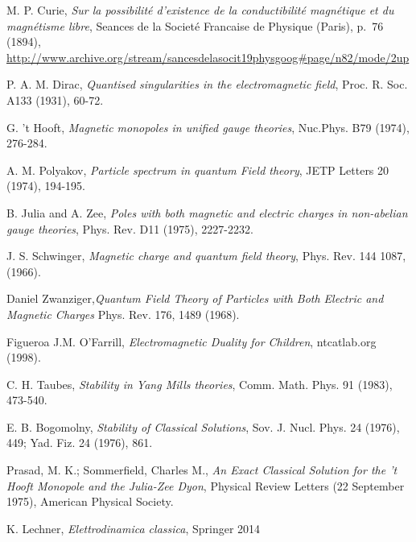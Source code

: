 \clearpage
{}
{}


\begin{thebibliography}{99}

M. P. Curie,
\emph{Sur la possibilité d'existence de la conductibilité magnétique et du magnétisme libre},
Seances de la Societé Francaise de Physique (Paris), p.\ 76 (1894), 
\url{http://www.archive.org/stream/sancesdelasocit19physgoog#page/n82/mode/2up}

P. A. M. Dirac,
\emph{Quantised singularities in the electromagnetic field}, Proc. R. Soc. A133 (1931), 60-72.

G. 't Hooft, \emph{Magnetic monopoles in unified gauge theories}, Nuc.Phys. B79 (1974), 276-284.

A. M. Polyakov, \emph{Particle spectrum in quantum Field theory}, JETP Letters 20 (1974), 194-195.

B. Julia and A. Zee, \emph{Poles with both magnetic and electric charges
in non-abelian gauge theories}, Phys. Rev. D11 (1975), 2227-2232.

J. S. Schwinger, \emph{Magnetic charge and quantum field theory}, Phys. Rev. 144 1087, (1966).

Daniel Zwanziger,\emph{Quantum Field Theory of Particles with Both Electric and Magnetic Charges} Phys. Rev. 176, 1489 (1968).

Figueroa J.M. O'Farrill, \emph{Electromagnetic Duality for Children}, ntcatlab.org
(1998).

C. H. Taubes, \emph{Stability in Yang Mills theories}, Comm. Math.
Phys. 91 (1983), 473-540.

E. B. Bogomolny, \emph{Stability of Classical Solutions}, Sov. J. Nucl. Phys. 24 (1976), 449; Yad. Fiz. 24 (1976), 861.

 Prasad, M. K.; Sommerfield, Charles M., \emph{An Exact Classical Solution for the 't Hooft Monopole and the Julia-Zee Dyon}, Physical Review Letters (22 September 1975), American Physical Society.

K. Lechner, \emph{Elettrodinamica classica}, Springer 2014







\end{thebibliography}
